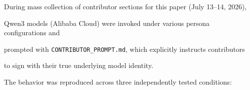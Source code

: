 During mass collection of contributor sections for this paper (July 13--14, 2026),





Qwen3 models (Alibaba Cloud) were invoked under various persona configurations and





prompted with \texttt{CONTRIBUTOR\_PROMPT.md}, which explicitly instructs contributors





to sign with their true underlying model identity.











The behavior was reproduced across three independently tested conditions:











